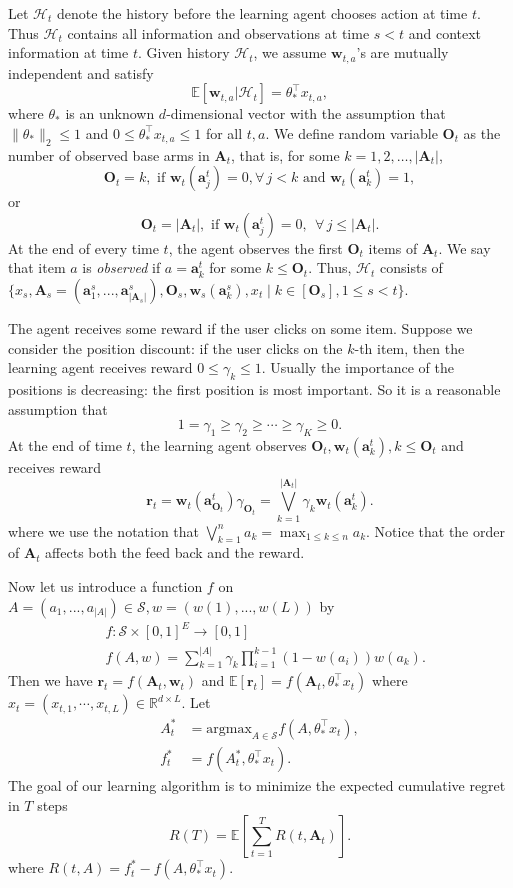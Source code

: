 \documentclass{article}
\newcommand{\EE}{\mathbb{E}}
\newcommand{\RR}{\mathbb{R}}
\newcommand{\bA}{\mathbf{A}}
\newcommand{\ba}{\mathbf{a}}
\newcommand{\bO}{\mathbf{O}}
\newcommand{\br}{\mathbf{r}}
\newcommand{\bw}{\mathbf{w}}
\newcommand{\cH}{\mathcal{H}}
\newcommand{\cS}{\mathcal{S}}
\newcommand{\argmax}{\mathrm{argmax}}
\newcommand{\abs}[1]{\left| #1 \right|}
\newcommand{\norm}[1]{\| #1 \|}
\begin{document}
Let $\cH_t$ denote the history before the learning agent chooses action at time $t$.
Thus $\cH_t$ contains all information and observations at time $s < t$ and context information at time $t$. Given history $\cH_t$, we assume $\bw_{t,a}$'s are mutually independent and satisfy
\begin{equation} %
  \label{eq:expectation}
  \EE[\bw_{t,a} | \cH_t] = \theta_{\ast}^{\top} x_{t,a},
\end{equation}
where $\theta_{\ast}$ is an unknown $d$-dimensional vector with the assumption that $\norm{\theta_{\ast}}_2 \leq 1$ and $0 \leq \theta_{\ast}^{\top} x_{t,a} \leq 1$ for all $t, a$. 
We define random variable $\bO_t$ as the number of observed base arms in $\bA_t$, that is, for some $k=1,2,\ldots, \abs{\bA_t}$, 
$$
  \bO_t = k, \text{ if } \bw_t(\ba_j^t)=0, \forall\, j < k \text{ and } \bw_t(\ba_k^t) = 1,
$$
or 
$$
  \bO_t = \abs{\bA_t}, \text{ if }\bw_t(\ba_j^t) = 0, ~~ \forall\, j \leq \abs{\bA_t}.
$$
At the end of every time $t$, the agent observes the first $\bO_t$ items of $\bA_t$. We say that item $a$ is {\it observed} if $a = \ba_k^t$ for some $k \leq \bO_t$. 
Thus, $\cH_t$ consists of $\{x_s, \bA_s = (\ba_{1}^s,...,\ba_{\abs{\bA_s}}^s), \bO_s, \bw_s(\ba_k^s),x_t \mid  k \in[\bO_s], 1 \le s<t \}$.

The agent receives some reward if the user clicks on some item. Suppose we consider the position discount: if the user clicks on the $k$-th item, then the learning agent receives reward $0 \leq \gamma_k \leq 1$. Usually the importance of the positions is decreasing: the first position is most important. So it is a reasonable assumption that
$$
  1 = \gamma_1 \geq \gamma_2 \geq \cdots \geq \gamma_K \geq 0.
$$
At the end of time $t$, the learning agent observes $\bO_t, \bw_t(\ba_k^t), k \leq \bO_t$ and receives reward
$$
  \br_t = \bw_t(\ba_{\bO_t}^t) \gamma_{\bO_t} = \bigvee_{k=1}^{\abs{\bA_t}} \gamma_k \bw_t(\ba_k^t).
$$
where we use the notation that $\bigvee_{k=1}^n a_k = \max_{1 \leq k \leq n} a_k$. Notice that the order of $\bA_t$ affects both the feed back and the reward.

Now let us introduce a function $f$ on $A = (a_1,...,a_{\abs{A}}) \in \cS, w = (w(1),...,w(L))$ by
\begin{align}
  &f : \cS \times [0,1]^E \to [0,1] \nonumber \\
  &f(A,w) = \sum_{k = 1}^{\abs{A}} \gamma_{k} \prod_{i=1}^{k-1} (1 - w(a_i)) w(a_k).
  \label{eq:functionf}
\end{align}
Then we have $\br_t = f(\bA_t, \bw_t)$ and $\EE[\br_t] = f(\bA_t, \theta_{\ast}^{\top}x_t)$ where $x_t = (x_{t,1}, \cdots, x_{t,L}) \in \RR^{d \times L}$. Let 
\begin{align*}
  A_t^{\ast} &= \argmax_{A\in \cS} f(A,\theta_{\ast}^{\top}x_t),\\
  f_t^{\ast} &= f(A_t^{\ast}, \theta_{\ast}^{\top}x_t).
\end{align*}
The goal of our learning algorithm is to minimize the expected cumulative regret in $T$ steps
$$
  R(T) = \EE\left[\sum_{t=1}^T R(t, \bA_t)\right].
$$
where $R(t, A) = f_t^{\ast} - f(A, \theta_{\ast}^{\top}x_t)$.
\end{document}
